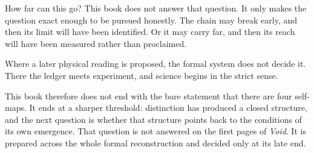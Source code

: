\documentclass[11pt,a4paper]{book}
\begin{document}
How far can this go? This book does not answer that question. It only makes
the question exact enough to be pursued honestly. The chain may break
early, and then its limit will have been identified. Or it may carry far,
and then its reach will have been measured rather than proclaimed.

Where a later physical reading is proposed, the formal system does not
decide it. There the ledger meets experiment, and science begins in the
strict sense.

This book therefore does not end with the bare statement that there are four
self-maps. It ends at a sharper threshold: distinction has produced a
closed structure, and the next question is whether that structure points
back to the conditions of its own emergence. That question is not answered
on the first pages of \textit{Void}. It is prepared across the whole formal
reconstruction and decided only at its late end.
\end{document}
